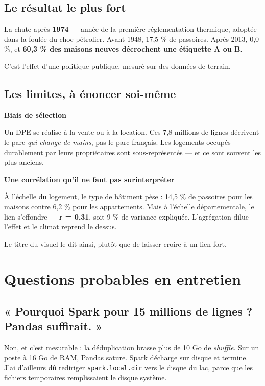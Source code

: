 \documentclass[11pt,a4paper]{article}
\newcommand{\cmd}[1]{\texttt{\small #1}}
\newcommand{\titrebloc}[1]{\textbf{\color{encre}#1}\par\vspace{0.25em}}
\begin{document}
\subsection{Le résultat le plus fort}

La chute après \textbf{1974} — année de la première réglementation thermique,
adoptée dans la foulée du choc pétrolier. Avant 1948, 17,5 \% de passoires.
Après 2013, 0,0 \%, et \textbf{60,3 \% des maisons neuves décrochent une
étiquette A ou B}.

C'est l'effet d'une politique publique, mesuré sur des données de terrain.

\subsection{Les limites, à énoncer soi-même}

\begin{attention}
\titrebloc{Biais de sélection}
Un DPE se réalise à la vente ou à la location. Ces 7,8 millions de lignes
décrivent le parc \emph{qui change de mains}, pas le parc français. Les
logements occupés durablement par leurs propriétaires sont sous-représentés —
et ce sont souvent les plus anciens.
\end{attention}

\begin{attention}
\titrebloc{Une corrélation qu'il ne faut pas surinterpréter}
À l'échelle du logement, le type de bâtiment pèse : 14,5 \% de passoires pour
les maisons contre 6,2 \% pour les appartements. Mais à l'échelle
départementale, le lien s'effondre — \textbf{r = 0,31}, soit 9 \% de variance
expliquée. L'agrégation dilue l'effet et le climat reprend le dessus.

Le titre du visuel le dit ainsi, plutôt que de laisser croire à un lien fort.
\end{attention}

\newpage
\section{Questions probables en entretien}

\subsection{« Pourquoi Spark pour 15 millions de lignes ? Pandas suffirait. »}

Non, et c'est mesurable : la déduplication brasse plus de 10 Go de
\emph{shuffle}. Sur un poste à 16 Go de RAM, Pandas sature. Spark décharge sur
disque et termine. J'ai d'ailleurs dû rediriger \cmd{spark.local.dir} vers le
disque du lac, parce que les fichiers temporaires remplissaient le disque
système.
\end{document}
